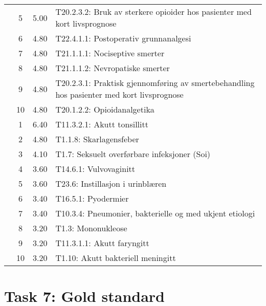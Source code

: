 \begin{table}[htbp]
\begin{tabularx}{\textwidth}{c c c X}
     & 5 & 5.00 & T20.2.3.2: Bruk av sterkere opioider hos pasienter med kort livsprognose \\
     & 6 & 4.80 & T22.4.1.1: Postoperativ grunnanalgesi \\
     & 7 & 4.80 & T21.1.1.1: Nociseptive smerter \\
     & 8 & 4.80 & T21.1.1.2: Nevropatiske smerter \\
     & 9 & 4.80 & T20.2.3.1: Praktisk gjennomføring av smertebehandling hos pasienter med kort livsprognose \\
     & 10 & 4.80 & T20.1.2.2: Opioidanalgetika \\
	\addlinespace
    8 & 1 & 6.40 & T11.3.2.1: Akutt tonsillitt \\
     & 2 & 4.80 & T1.1.8: Skarlagensfeber \\
     & 3 & 4.10 & T1.7: Seksuelt overførbare infeksjoner (Soi) \\
     & 4 & 3.60 & T14.6.1: Vulvovaginitt \\
     & 5 & 3.60 & T23.6: Instillasjon i urinblæren \\
     & 6 & 3.40 & T16.5.1: Pyodermier \\
     & 7 & 3.40 & T10.3.4: Pneumonier, bakterielle og med ukjent etiologi \\
     & 8 & 3.20 & T1.3: Mononukleose \\
     & 9 & 3.20 & T11.3.1.1: Akutt faryngitt \\
     & 10 & 3.20 & T1.10: Akutt bakteriell meningitt \\
	\bottomrule
\end{tabularx}
\end{table}


\section{Task 7: Gold standard}


